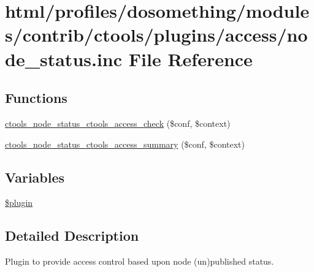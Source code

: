 \hypertarget{node__status_8inc}{
\section{html/profiles/dosomething/modules/contrib/ctools/plugins/access/node\_\-status.inc File Reference}
\label{node__status_8inc}
}
\subsection*{Functions}
\begin{DoxyCompactItemize}
\item 
\hyperlink{node__status_8inc_a2493a0d6a284ebfd109d5eba54b3d298}{ctools\_\-node\_\-status\_\-ctools\_\-access\_\-check} (\$conf, \$context)
\item 
\hyperlink{node__status_8inc_a99af9ccef78c55c4c2eeac817fa38252}{ctools\_\-node\_\-status\_\-ctools\_\-access\_\-summary} (\$conf, \$context)
\end{DoxyCompactItemize}
\subsection*{Variables}
\begin{DoxyCompactItemize}
\item 
\hyperlink{node__status_8inc_ada8a7130088351710bb02ed622d6bf65}{\$plugin}
\end{DoxyCompactItemize}


\subsection{Detailed Description}
Plugin to provide access control based upon node (un)published status. 


